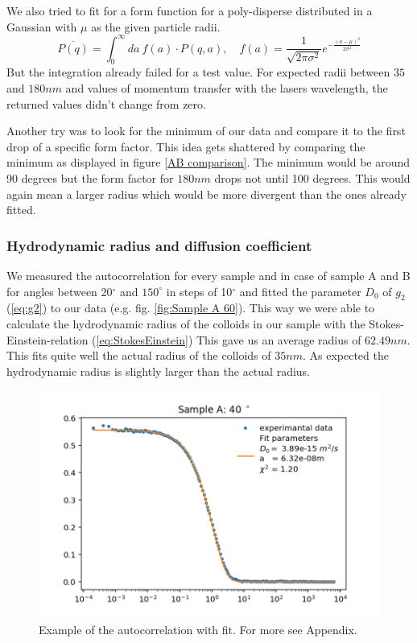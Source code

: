 \documentclass[]{article}
\begin{document}
We also tried to fit for a form function for a poly-disperse distributed in a Gaussian with $\mu$ as the given particle radii. 
\[ \overline{P(q)} = \int_0^\infty da\: f(a)\cdot P(q,a) , \quad f(a)= \frac{1}{\sqrt{2 \pi \sigma^2}} e^{-\frac{(a-\mu)^2}{2 \sigma^2}} \]
But the integration already failed for a test value. For expected radii between $35$ and $180nm$ and values of momentum transfer with the lasers wavelength, the returned values didn't change from zero.

Another try was to look for the minimum of our data and compare it to the first drop of a specific form factor. This idea gets shattered by comparing the minimum as displayed in figure \ref{AB comparison}. The minimum would be around 90 degrees but the form factor for $180nm$ drops not until 100 degrees. This would again mean a larger radius which would be more divergent than the ones already fitted.

\subsubsection{Hydrodynamic radius and diffusion coefficient}
We measured the autocorrelation for every sample and in case of sample A and B for angles between 20$^\circ$ and $150^\circ$ in steps of 10$^\circ$ and fitted the parameter $D_0$ of $g_2$ (\ref{eq:g2}) to our data (e.g. fig.  \ref{fig:Sample A 60}). This way we were able to calculate the hydrodynamic radius of the colloids in our sample with the Stokes-Einstein-relation (\ref{eq:StokesEinstein}) This gave us an average radius of $62.49 nm$. This fits quite well the actual radius of the colloids of $35nm$. As expected the  hydrodynamic radius is slightly larger than the actual radius. 


\begin{figure}[!htbp]
	\centering
	\includegraphics[width=0.7\linewidth]{Plots/A/40}
	\caption{Example of the autocorrelation with fit. For more see Appendix.}
	\label{fig:Sample A 40}
\end{figure}
\end{document}
